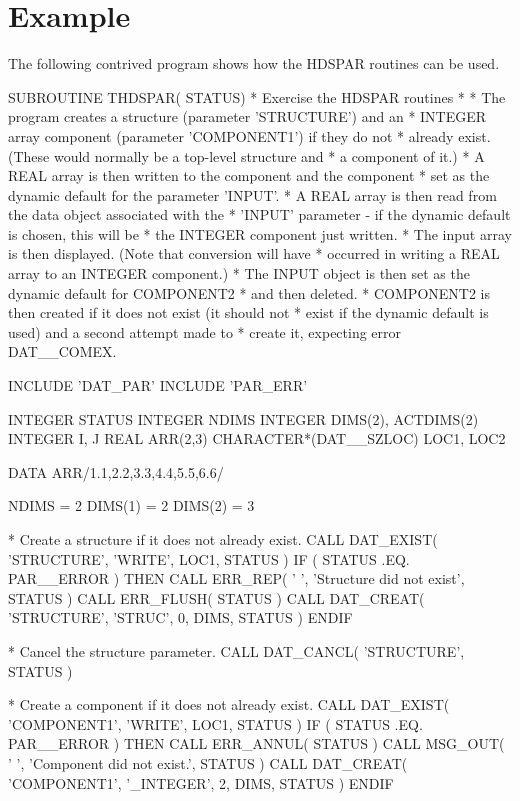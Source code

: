 \documentclass[twoside,11pt,nolof]{starlink}
\begin{document}
\section{Example\label{example}}
The following contrived program shows how the HDSPAR routines can be used.

\begin{terminalv}
      SUBROUTINE THDSPAR( STATUS)
*   Exercise the HDSPAR routines
*
*   The program creates a structure (parameter 'STRUCTURE') and an
*   INTEGER array component (parameter 'COMPONENT1') if they do not
*   already exist. (These would normally be a top-level structure and
*   a component of it.)
*   A REAL array is then written to the component and the component
*   set as the dynamic default for the parameter 'INPUT'.
*   A REAL array is then read from the data object associated with the
*   'INPUT' parameter - if the dynamic default is chosen, this will be
*   the INTEGER component just written.
*   The input array is then displayed. (Note that conversion will have
*   occurred in writing a REAL array to an INTEGER component.)
*   The INPUT object is then set as the dynamic default for COMPONENT2
*   and then deleted.
*   COMPONENT2 is then created if it does not exist (it should not
*   exist if the dynamic default is used) and a second attempt made to
*   create it, expecting error DAT__COMEX.

      INCLUDE 'DAT_PAR'
      INCLUDE 'PAR_ERR'

      INTEGER STATUS
      INTEGER NDIMS
      INTEGER DIMS(2), ACTDIMS(2)
      INTEGER I, J
      REAL ARR(2,3)
      CHARACTER*(DAT__SZLOC) LOC1, LOC2

      DATA ARR/1.1,2.2,3.3,4.4,5.5,6.6/

      NDIMS = 2
      DIMS(1) = 2
      DIMS(2) = 3

*   Create a structure if it does not already exist.
      CALL DAT_EXIST( 'STRUCTURE', 'WRITE', LOC1, STATUS )
      IF ( STATUS .EQ. PAR__ERROR ) THEN
         CALL ERR_REP( ' ', 'Structure did not exist', STATUS )
         CALL ERR_FLUSH( STATUS )
         CALL DAT_CREAT( 'STRUCTURE', 'STRUC', 0, DIMS, STATUS )
      ENDIF

*   Cancel the structure parameter.
      CALL DAT_CANCL( 'STRUCTURE', STATUS )

*   Create a component if it does not already exist.
      CALL DAT_EXIST( 'COMPONENT1', 'WRITE', LOC1, STATUS )
      IF ( STATUS .EQ. PAR__ERROR ) THEN
         CALL ERR_ANNUL( STATUS )
         CALL MSG_OUT( ' ', 'Component did not exist.', STATUS )
         CALL DAT_CREAT( 'COMPONENT1', '_INTEGER', 2, DIMS, STATUS )
      ENDIF


\end{terminalv}
\end{document}
